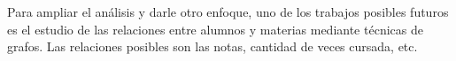 Para ampliar el análisis y darle otro enfoque, uno de los trabajos posibles futuros es el estudio de las relaciones entre alumnos y materias mediante técnicas de grafos. Las relaciones posibles son las notas, cantidad de veces cursada, etc. 